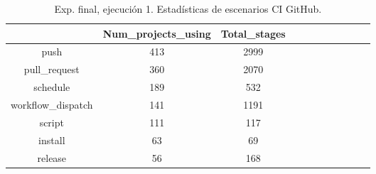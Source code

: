 \begin{table}[h]
  \centering
  \caption{Exp. final, ejecución 1. Estadísticas de escenarios CI GitHub.}
  \label{tab:tabla_f1_5}

\begin{footnotesize}
\renewcommand{\arraystretch}{1.5} %
\begin{tabular}{ccccccccccc}
  \hline
  {} &  Num\_projects\_using &  Total\_stages \\
  \hline
  push                        &                 413 &          2999 \\
  pull\_request                &                 360 &          2070 \\
  schedule                    &                 189 &           532 \\
  workflow\_dispatch           &                 141 &          1191 \\
  script                      &                 111 &           117 \\
  install                     &                  63 &            69 \\
  release                     &                  56 &           168 \\

\end{tabular}
\end{footnotesize}
\end{table}
